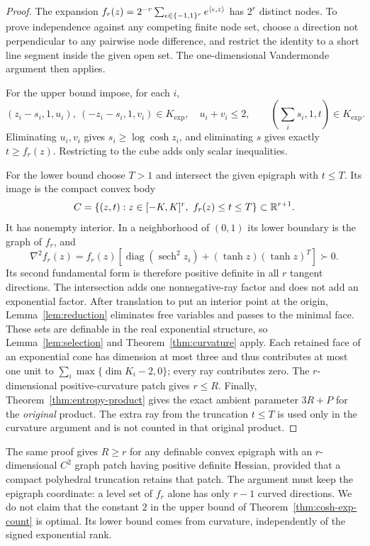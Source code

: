 \begin{proof}
The expansion
$f_r(z)=2^{-r}\sum_{\epsilon\in\{-1,1\}^r}e^{\langle \epsilon,z\rangle}$
has $2^r$ distinct nodes. To prove independence against any competing
finite node set, choose a direction not perpendicular to any pairwise
node difference, and restrict the identity to a short line segment
inside the given open set. The one-dimensional Vandermonde argument
then applies.

For the upper bound impose, for each $i$,
\[
 (z_i-s_i,1,u_i),\ (-z_i-s_i,1,v_i)\in K_{\exp},
 \quad u_i+v_i\leq2,
 \qquad \left(\sum_i s_i,1,t\right)\in K_{\exp}.
\]
Eliminating $u_i,v_i$ gives $s_i\geq\log\cosh z_i$, and eliminating
$s$ gives exactly $t\geq f_r(z)$. Restricting to the cube adds only
scalar inequalities.

For the lower bound choose $T>1$ and intersect the given epigraph with
$t\leq T$. Its image is the compact convex body
\[
 C=\{(z,t):z\in[-K,K]^r,\ f_r(z)\leq t\leq T\}
       \subset\mathbb R^{r+1}.
\]
It has nonempty interior. In a neighborhood of $(0,1)$ its lower
boundary is the graph of $f_r$, and
\begin{equation}\label{eq:cosh-hessian}
 \nabla^2 f_r(z)=f_r(z)\left[
    \operatorname{diag}(\operatorname{sech}^2 z_i)
                  +(\tanh z)(\tanh z)^T\right]\succ0.
\end{equation}
Its second fundamental form is therefore positive definite in all
$r$ tangent directions. The intersection adds one nonnegative-ray
factor and does not add an exponential factor. After translation to
put an interior point at the origin, Lemma~\ref{lem:reduction}
eliminates free variables and passes to the minimal face. These sets
are definable in the real exponential structure, so
Lemma~\ref{lem:selection} and Theorem~\ref{thm:curvature} apply. Each retained face of an
exponential cone has dimension at most three and thus contributes at
most one unit to $\sum_i\max\{\dim K_i-2,0\}$; every ray contributes
zero. The $r$-dimensional positive-curvature patch gives $r\leq R$.
Finally, Theorem~\ref{thm:entropy-product} gives the exact ambient
parameter $3R+P$ for the \emph{original} product. The extra ray from the
truncation $t\leq T$ is used only in the curvature argument and is not
counted in that original product.
\end{proof}

The same proof gives $R\geq r$ for any definable convex epigraph with
an $r$-dimensional $C^2$ graph patch having positive definite Hessian,
provided that a compact polyhedral truncation retains that patch.
The argument must keep the epigraph coordinate: a level set of $f_r$
alone has only $r-1$ curved directions.
We do not claim that the constant $2$ in the upper bound of
Theorem~\ref{thm:cosh-exp-count} is optimal. Its lower bound comes from
curvature, independently of the signed exponential rank.

